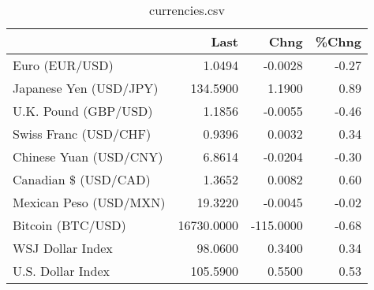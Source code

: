 \documentclass{article}%
\begin{document}
%


\begin{table}[htbp]%
\caption{currencies.csv}%
\centering%
\begin{adjustbox}{width=1\textwidth}%
\begin{tabular}{lrrr}
\toprule
                       &       Last &      Chng &  \%Chng \\
\midrule
        Euro (EUR/USD) &     1.0494 &   -0.0028 &  -0.27 \\
Japanese Yen (USD/JPY) &   134.5900 &    1.1900 &   0.89 \\
  U.K. Pound (GBP/USD) &     1.1856 &   -0.0055 &  -0.46 \\
 Swiss Franc (USD/CHF) &     0.9396 &    0.0032 &   0.34 \\
Chinese Yuan (USD/CNY) &     6.8614 &   -0.0204 &  -0.30 \\
  Canadian \$ (USD/CAD) &     1.3652 &    0.0082 &   0.60 \\
Mexican Peso (USD/MXN) &    19.3220 &   -0.0045 &  -0.02 \\
     Bitcoin (BTC/USD) & 16730.0000 & -115.0000 &  -0.68 \\
      WSJ Dollar Index &    98.0600 &    0.3400 &   0.34 \\
     U.S. Dollar Index &   105.5900 &    0.5500 &   0.53 \\
\bottomrule
\end{tabular}
%
\end{adjustbox}%
\end{table}

%
\end{document}
